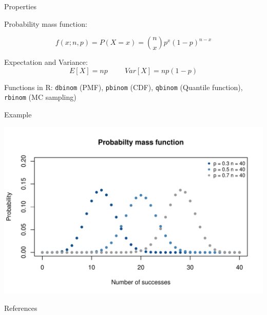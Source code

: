 \documentclass[english]{beamer}\usepackage[]{graphicx}\usepackage[]{xcolor}
\makeatletter
\def\maxwidth{ %
  \ifdim\Gin@nat@width>\linewidth
    \linewidth
  \else
    \Gin@nat@width
  \fi
}
\newenvironment{knitrout}{}{} %
\makeatother
\begin{document}
\begin{frame}{Properties}

Probability mass function:

\[
\textit{f}(x; n, p) = P(X = x) = \binom{n}{x} p^x (1-p)^{n-x}
\]

Expectation and Variance:
\[
E[X] = np \hspace{1cm} Var[X] = np(1-p)
\]

Functions in R:
\texttt{dbinom} (PMF), \texttt{pbinom} (CDF), \texttt{qbinom} (Quantile function),
\texttt{rbinom} (MC sampling)

\end{frame}
\begin{frame}{Example}

\begin{knitrout}
\color{fgcolor}
\includegraphics[width=\maxwidth]{figures/figunnamed-chunk-2-1} 
\end{knitrout}

\end{frame}
\begin{frame}{References}
   \footnotesize
   
   \nocite{held2014}

\end{frame}

\end{document}
